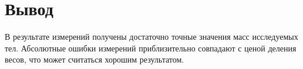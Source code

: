\section{Вывод}

В результате измерений получены достаточно точные значения масс исследуемых тел. Абсолютные ошибки измерений приблизительно совпадают с ценой деления весов, что может считаться хорошим результатом.